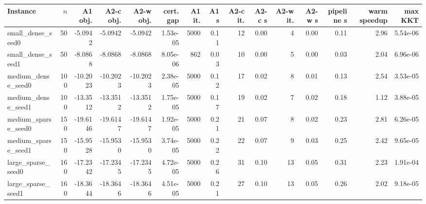 \begin{tabular}{lrrrrrrrrrrrrrr}
\toprule
Instance & $n$ & A1 obj. & A2-c obj. & A2-w obj. & cert. gap & A1 it. & A1 s & A2-c it. & A2-c s & A2-w it. & A2-w s & pipeline s & warm speedup & max KKT \\
\midrule
small\_dense\_seed0 & 50 & -5.0942 & -5.0942 & -5.0942 & 1.53e-05 & 5000 & 0.11 & 12 & 0.00 & 4 & 0.00 & 0.11 & 2.96 & 5.54e-06 \\
small\_dense\_seed1 & 50 & -8.0868 & -8.0868 & -8.0868 & 8.05e-06 & 862 & 0.03 & 10 & 0.00 & 5 & 0.00 & 0.03 & 2.04 & 6.96e-06 \\
medium\_dense\_seed0 & 100 & -10.2023 & -10.2023 & -10.2023 & 2.38e-05 & 5000 & 0.12 & 17 & 0.02 & 8 & 0.01 & 0.13 & 2.54 & 3.53e-05 \\
medium\_dense\_seed1 & 100 & -13.3512 & -13.3512 & -13.3512 & 1.75e-05 & 5000 & 0.17 & 19 & 0.02 & 7 & 0.02 & 0.18 & 1.12 & 3.88e-05 \\
medium\_sparse\_seed0 & 150 & -19.6146 & -19.6147 & -19.6147 & 1.92e-05 & 5000 & 0.21 & 21 & 0.07 & 8 & 0.02 & 0.23 & 2.81 & 6.26e-05 \\
medium\_sparse\_seed1 & 150 & -15.9528 & -15.9530 & -15.9530 & 3.74e-05 & 5000 & 0.22 & 22 & 0.07 & 9 & 0.03 & 0.25 & 2.42 & 9.65e-05 \\
large\_sparse\_seed0 & 160 & -17.2342 & -17.2345 & -17.2345 & 4.72e-05 & 5000 & 0.26 & 31 & 0.10 & 13 & 0.05 & 0.31 & 2.23 & 1.91e-04 \\
large\_sparse\_seed1 & 160 & -18.3644 & -18.3646 & -18.3646 & 4.51e-05 & 5000 & 0.21 & 27 & 0.10 & 13 & 0.05 & 0.26 & 2.02 & 9.18e-05 \\
\bottomrule
\end{tabular}